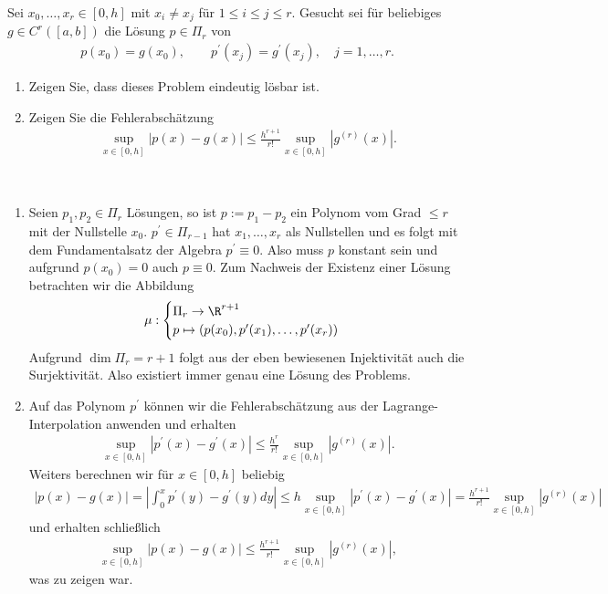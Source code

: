 \begin{exercise}
Sei $x_0,\dots,x_r \in [0,h]$ mit $x_i \neq x_j$ für $1 \leq i \leq j \leq r$.
Gesucht sei für beliebiges $g \in C^r([a,b])$ die Lösung $p \in \Pi_r$ von
\begin{align}
  p(x_0) = g(x_0), \qquad p^{\prime}(x_j) = g^{\prime}(x_j), \quad j = 1,\dots,r.
\end{align}
\begin{enumerate}[label = \textbf{\alph*)}]
  \item Zeigen Sie, dass dieses Problem eindeutig lösbar ist.
  \item Zeigen Sie die Fehlerabschätzung
  \begin{align}
    \sup_{x \in [0,h]} |p(x) - g(x)| \leq \frac{h^{r+1}}{r!}
    \sup_{x \in [0,h]}\left|g^{(r)}(x)\right|.
  \end{align}
\end{enumerate}
\end{exercise}
\begin{solution}
\leavevmode \\
\begin{enumerate}[label = \textbf{\alph*)}]
  \item Seien $p_1,p_2 \in \Pi_r$ Lösungen, so ist $p := p_1 - p_2$ ein Polynom vom Grad $\leq r$
  mit der Nullstelle $x_0$.
  $p^{\prime} \in \Pi_{r-1}$ hat $x_1,\dots,x_r$ als Nullstellen und es folgt mit
  dem Fundamentalsatz der Algebra $p^{\prime} \equiv 0$. Also muss $p$ konstant
  sein und aufgrund $p(x_0) = 0$ auch $p \equiv 0$.
  Zum Nachweis der Existenz einer Lösung betrachten wir die Abbildung
  \begin{align*}
    \mu: \begin{cases}
      \Pi_r \rightarrow \R^{r+1} \\
      p \mapsto (p(x_0),p^{\prime}(x_1),\dots,p^{\prime}(x_r))
    \end{cases}
  \end{align*}
  Aufgrund $\dim \Pi_r = r + 1$ folgt aus der eben bewiesenen Injektivität auch
  die Surjektivität. Also existiert immer genau eine Lösung des Problems.
  \item Auf das Polynom $p^{\prime}$ können wir die Fehlerabschätzung aus der
  Lagrange-Interpolation anwenden und erhalten
  \begin{align*}
      \sup_{x \in [0,h]} |p^{\prime}(x) - g^{\prime}(x)| \leq \frac{h^{r}}{r!}\sup_{x \in [0,h]} |g^{(r)}(x)|.
  \end{align*}
  Weiters berechnen wir für $x \in [0,h]$ beliebig
  \begin{align*}
    |p(x) - g(x)| = \left|\int_0^x p^{\prime}(y) - g^{\prime}(y) dy \right| \leq h \sup_{x \in [0,h]} |p^{\prime}(x) - g^{\prime}(x)| =
    \frac{h^{r+1}}{r!}\sup_{x \in [0,h]} |g^{(r)}(x)|
  \end{align*}
  und erhalten schließlich
  \begin{align*}
  \sup_{x \in [0,h]} |p(x) - g(x)| \leq \frac{h^{r+1}}{r!}
  \sup_{x \in [0,h]}\left|g^{(r)}(x)\right|,
  \end{align*}
  was zu zeigen war.
\end{enumerate}

\end{solution}

